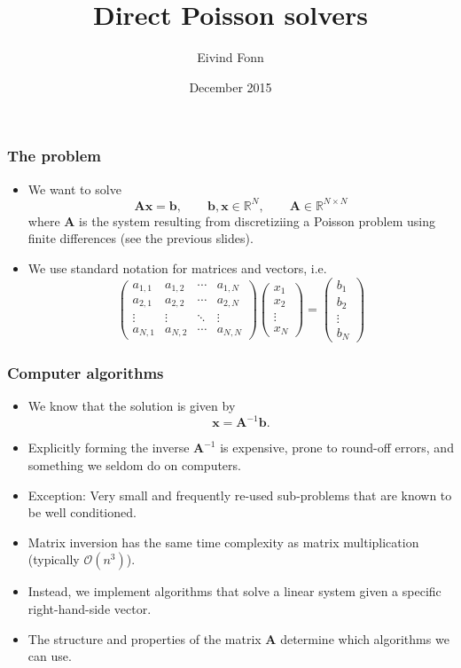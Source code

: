 

\title{Direct Poisson solvers}
\author{Eivind Fonn}
\date{December 2015}
\maketitle

\begin{frame}
  \frametitle{The problem}
  \begin{itemize}
  \item We want to solve
    \[
      \bm A \bm x = \bm b, \qquad
      \bm b, \bm x \in \mathbb{R}^N, \qquad
      \bm A \in \mathbb{R}^{N \times N}
    \]
    where $\bm A$ is the system resulting from discretiziing a Poisson problem
    using finite differences (see the previous slides).
  \item We use standard notation for matrices and vectors, i.e.
    \[
      \begin{pmatrix}
        a_{1,1} & a_{1,2} & \cdots & a_{1,N} \\
        a_{2,1} & a_{2,2} & \cdots & a_{2,N} \\
        \vdots  & \vdots  & \ddots & \vdots  \\
        a_{N,1} & a_{N,2} & \cdots & a_{N,N}
      \end{pmatrix}
      \begin{pmatrix} x_1 \\ x_2 \\ \vdots \\ x_N \end{pmatrix} =
      \begin{pmatrix} b_1 \\ b_2 \\ \vdots \\ b_N \end{pmatrix}
    \]
  \end{itemize}
\end{frame}

\begin{frame}
  \frametitle{Computer algorithms}
  \begin{itemize}
  \item We know that the solution is given by
    \[ \bm x = \bm A^{-1} \bm b. \]
  \item Explicitly forming the inverse $\bm A^{-1}$ is expensive, prone to
    round-off errors, and something we seldom do on computers.
  \item Exception: Very small and frequently re-used sub-problems that are known
    to be well conditioned.
  \item Matrix inversion has the same time complexity as matrix multiplication
    (typically $\mathcal{O}(n^3)$).
  \item Instead, we implement algorithms that solve a linear system given a
    specific right-hand-side vector.
  \item The structure and properties of the matrix $\bm A$ determine which
    algorithms we can use.
  \end{itemize}
\end{frame}

